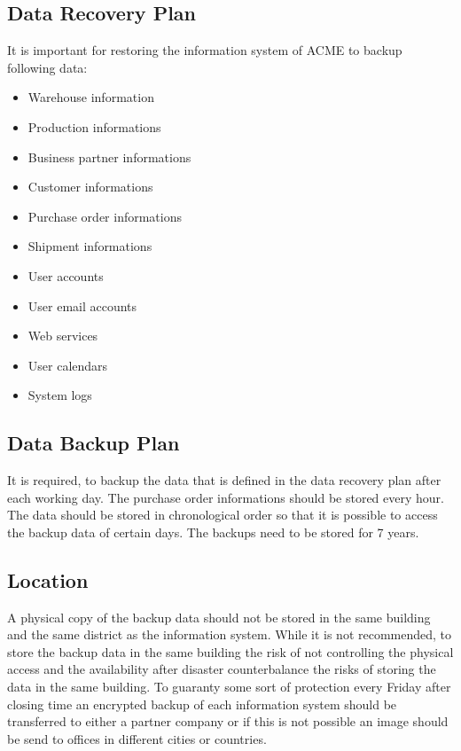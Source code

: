\subsection{Data Recovery Plan}

It is important for restoring the information system of ACME to backup
following data:

\begin{itemize}
\item Warehouse information
\item Production informations
\item Business partner informations
\item Customer informations
\item Purchase order informations
\item Shipment informations
\item User accounts
\item User email accounts
\item Web services
\item User calendars
\item System logs
\end{itemize}

\subsection{Data Backup Plan}
It is required, to backup the data that is defined in the data recovery
plan after each working day. The purchase order informations should be
stored every hour. The data should be stored in chronological order so
that it is possible to access the backup data of certain days. The
backups need to be stored for 7 years.   

\subsection{Location}

A physical copy of the backup data should not be stored in the same
building and the same district as the information system. While it is
not recommended, to store the backup data in the same building the risk
of not controlling the physical access and the availability after
disaster counterbalance the risks of storing the data in the same
building. To guaranty some sort of protection every Friday after closing
time an encrypted backup of each information system should be
transferred to either a partner company or if this is not possible an
image should be send to offices in different cities or countries.   

